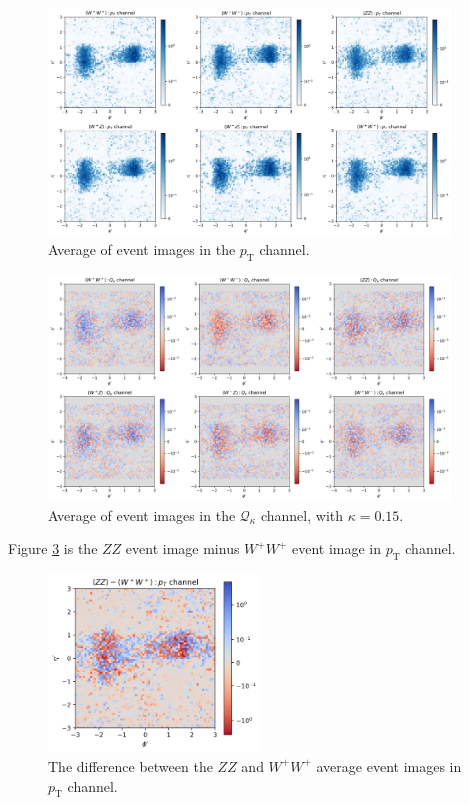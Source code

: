 \documentclass[12pt]{article}
\begin{document}
		\begin{figure}[htpb]
			\centering
			\includegraphics[width=0.95\textwidth]{event_image_PT.png}
			\caption{Average of event images in the $p_\text{T}$ channel.}
			\label{fig:event_image_PT}
		\end{figure}
		\begin{figure}[htpb]
			\centering
			\includegraphics[width=0.95\textwidth]{event_image_Qk.png}
			\caption{Average of event images in the $\mathcal{Q}_\kappa$ channel, with $\kappa = 0.15$.}
			\label{fig:event_image_Qk}
		\end{figure}

		Figure \ref{fig:event_image_PT_ZZ-W+W+} is the $ZZ$ event image minus $W^{+}W^{+}$ event image in $p_\text{T}$ channel.
		\begin{figure}[htpb]
			\centering
			\includegraphics[width=0.5\textwidth]{event_image_PT_ZZ-W+W+.png}
			\caption{The difference between the $ZZ$ and $W^{+}W^{+}$ average event images in $p_\text{T}$ channel.}
			\label{fig:event_image_PT_ZZ-W+W+}
		\end{figure}
\end{document}
